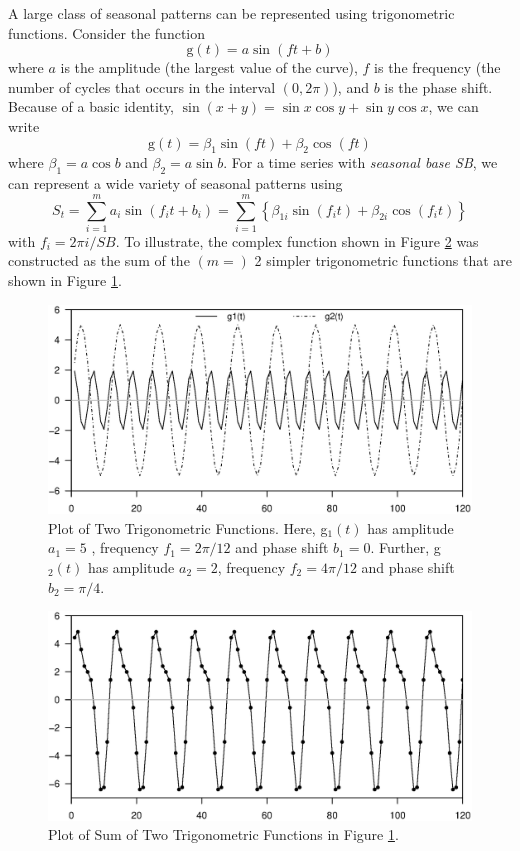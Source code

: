 A large class of seasonal patterns can be represented using
trigonometric functions. Consider the function
\begin{equation*}
\mathrm{g}(t)=a\sin (ft+b)
\end{equation*}
where $a$ is the amplitude (the largest value of the curve), $f$ is
the frequency (the number of cycles that occurs in the interval
$(0,2\pi )$), and $b$ is the phase shift. Because of a basic
identity, $\sin (x+y) = \sin x \cos y + \sin y \cos x$, we can write
\begin{equation*}
\mathrm{g}(t) = \beta_1 \sin (ft) + \beta_2 \cos (ft)
\end{equation*}
where $\beta_1 = a \cos b$ and $\beta_2 = a \sin b$. For a time
series with \emph{seasonal base SB}, we can represent a wide variety
of seasonal patterns using
\begin{equation}\label{E9:SeasonalEffect}
S_t = \sum_{i=1}^m a_i \sin (f_i t + b_i) = \sum_{i=1}^m \left\{
\beta_{1i} \sin (f_i t) + \beta_{2i} \cos (f_i t) \right\}
\end{equation}
with $f_i=2\pi i/SB$. To illustrate, the complex function shown in
Figure \ref{F9:TrigFctSum} was constructed as the sum of the $(m=)$
2 simpler trigonometric functions that are shown in Figure
\ref{F9:TrigFctb}.


\begin{figure}[htp]
  \begin{center}
    \includegraphics[width=.6\textwidth]
     {Chapter9Forecasting/TrigFctb.eps}
    \caption{\label{F9:TrigFctb} \small Plot of Two
Trigonometric Functions. Here, g$_1(t)$ has amplitude $a_1=5$ ,
frequency $f_1=2 \pi /12$ and phase shift $b_1=0$. Further, g$_2(t)$
has amplitude $a_2=2$, frequency $f_2=4 \pi/12 $ and phase shift
$b_2=\pi/4$.}
  \end{center}
\end{figure}


\bigskip

\begin{figure}[htp]
  \begin{center}
     \includegraphics[width=.6\textwidth]
     {Chapter9Forecasting/TrigFctSum.eps}
    \caption{\label{F9:TrigFctSum} \small Plot of Sum of Two Trigonometric Functions in Figure \ref{F9:TrigFctb}.}
  \end{center}
\end{figure}


